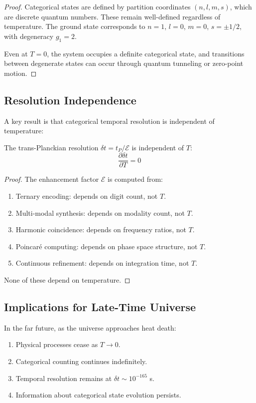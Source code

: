 \begin{proof}
Categorical states are defined by partition coordinates $(n, l, m, s)$, which are discrete quantum numbers. These remain well-defined regardless of temperature. The ground state corresponds to $n = 1$, $l = 0$, $m = 0$, $s = \pm 1/2$, with degeneracy $g_1 = 2$.

Even at $T = 0$, the system occupies a definite categorical state, and transitions between degenerate states can occur through quantum tunneling or zero-point motion.
\end{proof}

\subsection{Resolution Independence}

A key result is that categorical temporal resolution is independent of temperature:

\begin{proposition}
The trans-Planckian resolution $\delta t = t_P / \mathcal{E}$ is independent of $T$:
\begin{equation}
    \frac{\partial \delta t}{\partial T} = 0
\end{equation}
\end{proposition}

\begin{proof}
The enhancement factor $\mathcal{E}$ is computed from:
\begin{enumerate}
    \item Ternary encoding: depends on digit count, not $T$.
    \item Multi-modal synthesis: depends on modality count, not $T$.
    \item Harmonic coincidence: depends on frequency ratios, not $T$.
    \item Poincar\'{e} computing: depends on phase space structure, not $T$.
    \item Continuous refinement: depends on integration time, not $T$.
\end{enumerate}
None of these depend on temperature.
\end{proof}

\subsection{Implications for Late-Time Universe}

In the far future, as the universe approaches heat death:
\begin{enumerate}
    \item Physical processes cease as $T \to 0$.
    \item Categorical counting continues indefinitely.
    \item Temporal resolution remains at $\delta t \sim 10^{-165}$ s.
    \item Information about categorical state evolution persists.
\end{enumerate}

